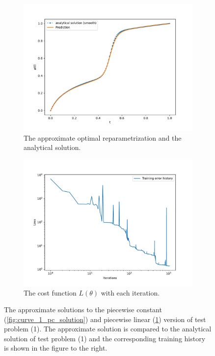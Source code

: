 \begin{figure}[t]
\begin{subfigure}[t]{0.5\textwidth}
    \end{subfigure}
    \begin{subfigure}[t]{0.5\textwidth}
        \centering
        \includegraphics[width=\linewidth]{figures/curve_1_pl/exp_2/plot_0_0.pdf}
        \caption{The approximate optimal reparametrization and the analytical solution.}
        \label{fig:curve_1_pl_solution}
    \end{subfigure}
    \begin{subfigure}[t]{0.5\textwidth}
        \centering
        \includegraphics[width=\linewidth]{figures/curve_1_pl/exp_2/history_plot_0.pdf}
        \caption{The cost function \(L(\theta)\) with each iteration.}
        \label{fig:curve_1_pl_history}
    \end{subfigure}
    \caption{The approximate solutions to the piecewise constant (\ref{fig:curve_1_pc_solution}) and piecewise linear (\ref{fig:curve_1_pl_solution}) version of test problem (1). The approximate solution is compared to the analytical solution of test problem (1) and the corresponding training history is shown in the figure to the right.}
\end{figure}

